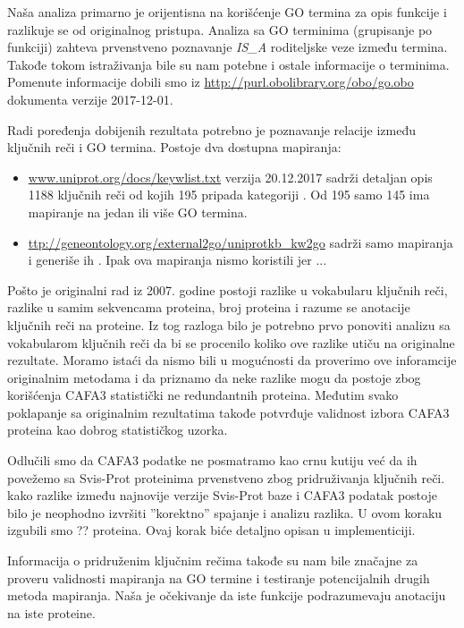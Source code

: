 Naša analiza primarno je orijentisna na korišćenje GO termina za opis funkcije
i razlikuje se od originalnog pristupa.  Analiza sa GO terminima (grupisanje po
funkciji) zahteva prvenstveno poznavanje \textit{IS\_A} roditeljske veze između
termina. Takođe tokom istraživanja bile su nam potebne i ostale informacije o
terminima. Pomenute informacije dobili smo iz
\url{http://purl.obolibrary.org/obo/go.obo} dokumenta verzije 2017-12-01.

Radi poređenja dobijenih rezultata potrebno je poznavanje relacije između
ključnih reči i GO termina. Postoje dva dostupna mapiranja:
\begin{itemize}
  \item \url{www.uniprot.org/docs/keywlist.txt} verzija 20.12.2017 sadrži
    detaljan opis 1188 ključnih reči od kojih 195 pripada kategoriji
    .  Od 195 samo 145 ima mapiranje na jedan ili
    više GO termina.
  \item \url{ttp://geneontology.org/external2go/uniprotkb_kw2go} sadrži samo
    mapiranja i generiše ih  \parencite{Barrell2009}.
    Ipak ova mapiranja nismo koristili jer ... 
\end{itemize}

Pošto je originalni rad \parencite{Xie2007} iz 2007. godine postoji razlike u
vokabularu ključnih reči, razlike u samim sekvencama proteina, broj proteina i
razume se anotacije ključnih reči na proteine.  Iz tog razloga bilo je potrebno
prvo ponoviti analizu sa vokabularom ključnih reči da bi se procenilo koliko
ove razlike utiču na originalne rezultate. Moramo istaći da nismo bili u
mogućnosti da proverimo ove inforamcije originalnim metodama i da priznamo da
neke razlike mogu da postoje zbog korišćenja CAFA3 statistički ne redundantnih
proteina. Međutim svako poklapanje sa originalnim rezultatima takođe potvrđuje
validnost izbora CAFA3 proteina kao dobrog statističkog uzorka.

Odlučili smo da CAFA3 podatke ne posmatramo kao crnu kutiju već da ih povežemo
sa Svis-Prot proteinima prvenstveno zbog pridruživanja ključnih reči.  kako
razlike između najnovije verzije Svis-Prot baze i CAFA3 podatak postoje bilo je
neophodno izvršiti ''korektno'' spajanje i analizu razlika. U ovom koraku
izgubili smo ?? proteina. Ovaj korak biće detaljno opisan u implementiciji.

Informacija o pridruženim ključnim rečima takođe su nam bile značajne za
proveru validnosti mapiranja na GO termine i testiranje potencijalnih drugih
metoda mapiranja. Naša je očekivanje da iste funkcije podrazumevaju
anotaciju na iste proteine.


